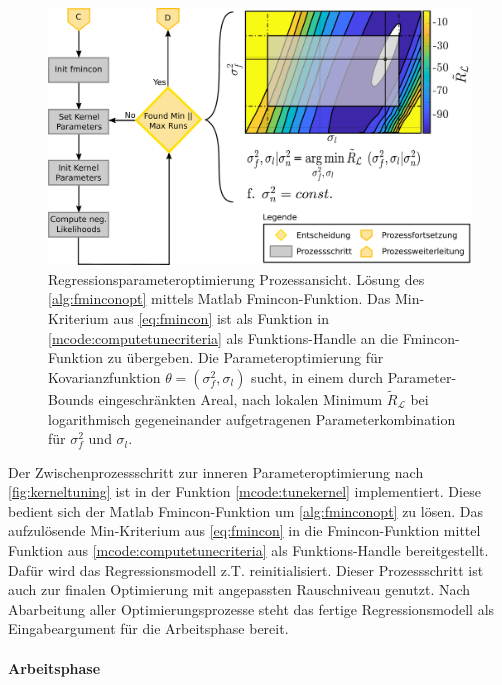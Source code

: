 \clearpage



\begin{figure}[th!]
	\centering
	\includegraphics[width=0.8\linewidth]{chapters/images/3-SW-E-OExp/Kernel_Tuning}
	\caption[Regressionsparameteroptimierung Prozessansicht]{Regressionsparameteroptimierung Prozessansicht. Lösung des \autoref{alg:fminconopt} mittels Matlab Fmincon-Funktion. Das Min-Kriterium aus \autoref{eq:fmincon} ist als Funktion in \autoref{mcode:computetunecriteria} als Funktions-Handle an die Fmincon-Funktion zu übergeben. Die Parameteroptimierung für Kovarianzfunktion $\theta = (\sigma_f^2,\sigma_l)$ sucht, in einem durch Parameter-Bounds eingeschränkten Areal, nach lokalen Minimum $\tilde{R}_{\mathcal{L}}$ bei logarithmisch gegeneinander aufgetragenen Parameterkombination für $\sigma_f^2$ und $\sigma_l$.}
	\label{fig:kerneltuning}
\end{figure}



Der Zwischenprozessschritt zur inneren Parameteroptimierung nach \autoref{fig:kerneltuning} ist in der Funktion \autoref{mcode:tunekernel} implementiert. Diese bedient sich der Matlab Fmincon-Funktion um \autoref{alg:fminconopt} zu lösen. Das aufzulösende Min-Kriterium aus \autoref{eq:fmincon} in die Fmincon-Funktion mittel Funktion aus \autoref{mcode:computetunecriteria} als Funktions-Handle bereitgestellt. Dafür wird das Regressionsmodell z.T. reinitialisiert. Dieser Prozessschritt ist auch zur finalen Optimierung mit angepassten Rauschniveau genutzt.
Nach Abarbeitung aller Optimierungsprozesse steht das fertige Regressionsmodell als Eingabeargument für die Arbeitsphase bereit.


\clearpage


\paragraph{Arbeitsphase}\label{par:gpr-work-pro}$~$\\



